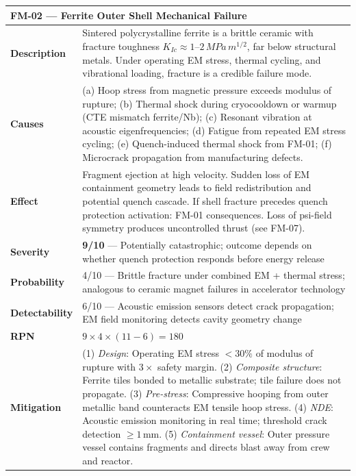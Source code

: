 \documentclass[11pt,a4paper]{article}
\newcommand{\Scrit}[1]{\cellcolor{risk-critical!40}\textbf{#1}}
\newcommand{\Shigh}[1]{\cellcolor{risk-high!40}\textbf{#1}}
\begin{document}
\begin{longtable}{p{0.25\tw}p{0.65\tw}}
\toprule
\multicolumn{2}{l}{\textbf{FM-02 --- Ferrite Outer Shell Mechanical Failure}} \\
\midrule
\endhead
\textbf{Description} &
  Sintered polycrystalline ferrite is a brittle ceramic with fracture
  toughness $K_{Ic} \approx 1$--$2\,\si{MPa\,m^{1/2}}$, far below
  structural metals. Under operating EM stress, thermal cycling, and
  vibrational loading, fracture is a credible failure mode. \\[4pt]
\textbf{Causes} &
  (a) Hoop stress from magnetic pressure exceeds modulus of rupture;
  (b) Thermal shock during cryocooldown or warmup (CTE mismatch
  ferrite/Nb); (c) Resonant vibration at acoustic eigenfrequencies;
  (d) Fatigue from repeated EM stress cycling; (e) Quench-induced
  thermal shock from FM-01; (f) Microcrack propagation from
  manufacturing defects. \\[4pt]
\textbf{Effect} &
  Fragment ejection at high velocity. Sudden loss of EM containment
  geometry leads to field redistribution and potential quench cascade.
  If shell fracture precedes quench protection activation: FM-01
  consequences. Loss of psi-field symmetry produces uncontrolled
  thrust (see FM-07). \\[4pt]
\textbf{Severity} & \Scrit{9/10} --- Potentially catastrophic; outcome
  depends on whether quench protection responds before energy release \\[4pt]
\textbf{Probability} & 4/10 --- Brittle fracture under combined EM +
  thermal stress; analogous to ceramic magnet failures in
  accelerator technology \\[4pt]
\textbf{Detectability} & 6/10 --- Acoustic emission sensors detect crack
  propagation; EM field monitoring detects cavity geometry change \\[4pt]
\textbf{RPN} & \Shigh{$9 \times 4 \times (11-6) = 180$} \\[4pt]
\textbf{Mitigation} &
  (1) \textit{Design}: Operating EM stress $< 30\%$ of modulus of rupture
  with $3\times$ safety margin. (2) \textit{Composite structure}: Ferrite
  tiles bonded to metallic substrate; tile failure does not propagate.
  (3) \textit{Pre-stress}: Compressive hooping from outer metallic band
  counteracts EM tensile hoop stress. (4) \textit{NDE}: Acoustic emission
  monitoring in real time; threshold crack detection $\geq 1$\,mm.
  (5) \textit{Containment vessel}: Outer pressure vessel contains
  fragments and directs blast away from crew and reactor. \\
\bottomrule
\end{longtable}
\end{document}

